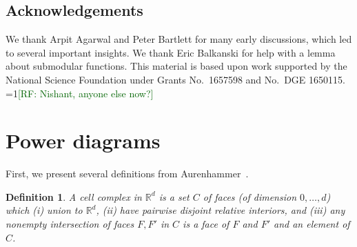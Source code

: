 \documentclass[12pt]{article}
\newcommand{\Comments}{1}
\newcommand{\mynote}[2]{\ifnum\Comments=1\textcolor{#1}{#2}\fi}
\newcommand{\raf}[1]{\mynote{darkgreen}{[RF: #1]}}
\newcommand{\jessie}[1]{\mynote{teal}{[JF: #1]}}
\newcommand{\reals}{\mathbb{R}}
\newtheorem{conjecture}{Conjecture}
\newtheorem{definition}{Definition}
\begin{document}




\subsection*{Acknowledgements}
We thank Arpit Agarwal and Peter Bartlett for many early discussions, which led to several important insights.
We thank Eric Balkanski for help with a lemma about submodular functions. %
This material is based upon work supported by the National Science Foundation under Grants No.\ 1657598 and No.\ DGE 1650115.
\raf{Nishant, anyone else now?}
\newpage



\appendix

\newpage
\section{Power diagrams}\label{app:power-diagrams}
First, we present several definitions from Aurenhammer~\cite{aurenhammer1987power}.
\begin{definition}\label{def:cell-complex}
  A \emph{cell complex} in $\reals^d$ is a set $C$ of faces (of dimension $0,\ldots,d$) which (i) union to $\reals^d$, (ii) have pairwise disjoint relative interiors, and (iii) any nonempty intersection of faces $F,F'$ in $C$ is a face of $F$ and $F'$ and an element of $C$.
\end{definition}
\end{document}
